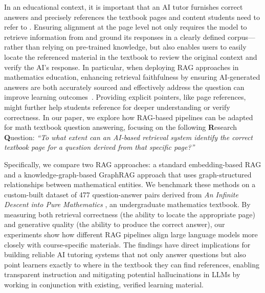\documentclass[runningheads]{llncs}
\begin{document}
In an educational context, it is important that an AI tutor furnishes correct answers and precisely references the textbook pages and content students need to refer to \cite{DAI2024100299,olney_improving_2024}. Ensuring alignment at the page level not only requires the model to retrieve information from and ground its responses in a clearly defined corpus—rather than relying on pre-trained knowledge, but also enables users to easily locate the referenced material in the textbook to review the original context and verify the AI’s response. In particular, when deploying RAG approaches in mathematics education, enhancing retrieval faithfulness by ensuring AI-generated answers are both accurately sourced and effectively address the question can improve learning outcomes~\cite{chiesurin-etal-2023-dangers,levonian2023retrievalaugmentedgenerationimprovemath}. Providing explicit pointers, like page references, might further help students reference for deeper understanding or verify correctness.
In our paper, we explore how RAG-based pipelines can be adapted for math textbook question answering, focusing on the following \textbf{R}esearch \textbf{Q}uestion: \emph{``To what extent can an AI-based retrieval system identify the correct textbook page for a question derived from that specific page?''} 

Specifically, we compare two RAG approaches: a standard embedding-based RAG and a knowledge-graph-based GraphRAG \cite{edge2024localglobalgraphrag} approach that uses graph-structured relationships between mathematical entities. We benchmark these methods on a custom-built dataset of 477 question-answer pairs derived from \emph{An Infinite Descent into Pure Mathematics} \cite{newstead2024infinite}, an undergraduate mathematics textbook. By measuring both retrieval correctness (the ability to locate the appropriate page) and generative quality (the ability to produce the correct answer), our experiments show how different RAG pipelines align large language models more closely with course-specific materials. The findings have direct implications for building reliable AI tutoring systems that not only answer questions but also point learners exactly to where in the textbook they can find references, enabling transparent instruction and mitigating potential hallucinations in LLMs by working in conjunction with existing, verified learning material.
\end{document}
